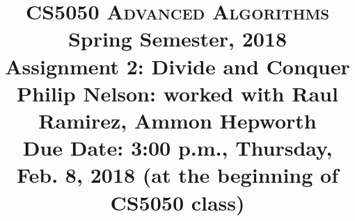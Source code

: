 \documentclass[11pt]{article}
\begin{document}
\baselineskip=14.0pt

\title{CS5050 \textsc{Advanced Algorithms}
\\{\Large Spring Semester, 2018}
\\ Assignment 2: Divide and Conquer
\\{\Large {\bf Philip Nelson}: worked with Raul Ramirez, Ammon Hepworth}
\\ {\large {\bf Due Date: 3:00 p.m.}, Thursday, Feb. 8, 2018 ({\bf at the beginning of CS5050 class})}}
\date{}

\maketitle

\vspace{-0.9in}
\end{document}

